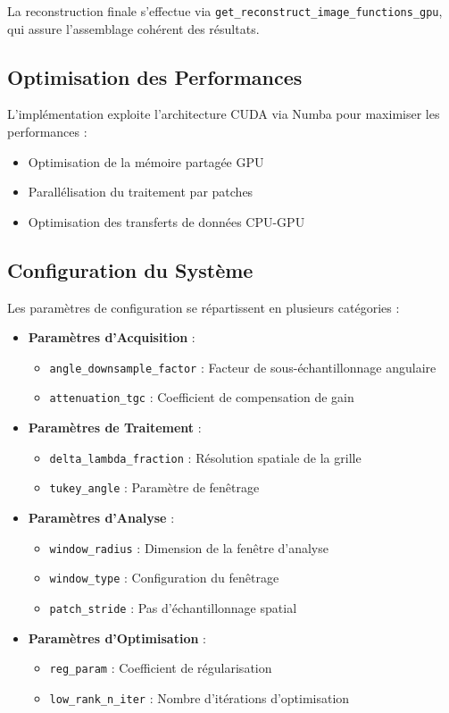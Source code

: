 \documentclass[12pt,a4paper]{article}
\begin{document}
La reconstruction finale s'effectue via \texttt{get\_reconstruct\_image\_functions\_gpu}, qui assure l'assemblage cohérent des résultats.

\subsection{Optimisation des Performances}
L'implémentation exploite l'architecture CUDA via Numba pour maximiser les performances :

\begin{itemize}
    \item Optimisation de la mémoire partagée GPU
    \item Parallélisation du traitement par patches
    \item Optimisation des transferts de données CPU-GPU
\end{itemize}

\subsection{Configuration du Système}
Les paramètres de configuration se répartissent en plusieurs catégories :

\begin{itemize}
    \item \textbf{Paramètres d'Acquisition} :
    \begin{itemize}
        \item \texttt{angle\_downsample\_factor} : Facteur de sous-échantillonnage angulaire
        \item \texttt{attenuation\_tgc} : Coefficient de compensation de gain
    \end{itemize}
    
    \item \textbf{Paramètres de Traitement} :
    \begin{itemize}
        \item \texttt{delta\_lambda\_fraction} : Résolution spatiale de la grille
        \item \texttt{tukey\_angle} : Paramètre de fenêtrage
    \end{itemize}
    
    \item \textbf{Paramètres d'Analyse} :
    \begin{itemize}
        \item \texttt{window\_radius} : Dimension de la fenêtre d'analyse
        \item \texttt{window\_type} : Configuration du fenêtrage
        \item \texttt{patch\_stride} : Pas d'échantillonnage spatial
    \end{itemize}
    
    \item \textbf{Paramètres d'Optimisation} :
    \begin{itemize}
        \item \texttt{reg\_param} : Coefficient de régularisation
        \item \texttt{low\_rank\_n\_iter} : Nombre d'itérations d'optimisation
    \end{itemize}
\end{itemize}
\end{document}
